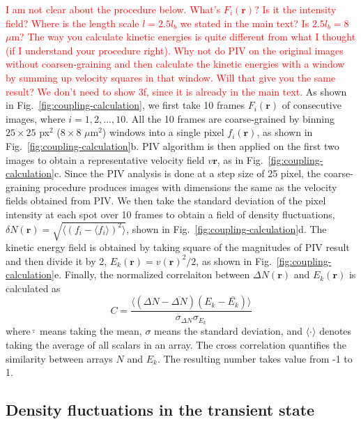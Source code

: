 \documentclass[twocolumn,aps,prx,amsmath,amssymb,longbibliography]{revtex4-2}
\begin{document}
\textcolor{red}{I am not clear about the procedure below. What's $F_i(\bm{r})$? Is it the intensity field? Where is the length scale $l = 2.5l_b$ we stated in the main text? Is $2.5l_b = 8$ $\mu$m? The way you calculate kinetic energies is quite different from what I thought (if I understand your procedure right). Why not do PIV on the original images without coarsen-graining and then calculate the kinetic energies with a window by summing up velocity squares in that window. Will that give you the same result? We don't need to show 3f, since it is already in the main text.}
As shown in Fig.~\ref{fig:coupling-calculation}, we first take 10 frames $F_i(\bm{r})$ of consecutive images, where $i=1, 2, ..., 10$. All the 10 frames are coarse-grained by binning $25\times 25$ px$^2$ ($8\times8$ $\mu$m$^2$) windows into a single pixel $f_i(\bm{r})$, as shown in Fig.~\ref{fig:coupling-calculation}b. PIV algorithm is then applied on the first two images to obtain a representative velocity field $v{\bm{r}}$, as in Fig.~\ref{fig:coupling-calculation}c. Since the PIV analysis is done at a step size of 25 pixel, the coarse-graining procedure produces images with dimensions the same as the velocity fields obtained from PIV. We then take the standard deviation of the pixel intensity at each spot over 10 frames to obtain a field of density fluctuations, $\delta N(\bm{r}) = \sqrt{\langle(f_i-\langle f_i\rangle)^2\rangle}$, shown in Fig.~\ref{fig:coupling-calculation}d. The kinetic energy field is obtained by taking square of the magnitudes of PIV result and then divide it by 2, $E_k(\bm{r})= v(\bm{r})^2 / 2 $, as shown in Fig.~\ref{fig:coupling-calculation}e. Finally, the normalized correlaiton between $\Delta N(\bm{r})$ and $E_k(\bm{r})$ is calculated as
%
\begin{equation}
  C = \frac{\langle(\Delta N-\overline{\Delta N})(E_k-\overline{E_k})\rangle}{\sigma_{\Delta N}\sigma_{E_k}}
\end{equation}
%
where$\bar\cdot$ means taking the mean, $\sigma$ means the standard deviation, and $\langle\cdot\rangle$ denotes taking the average of all scalars in an array. The cross correlation quantifies the similarity between arrays $N$ and $E_k$. The resulting number takes value from -1 to 1.

\subsection{Density fluctuations in the transient state}
\end{document}
